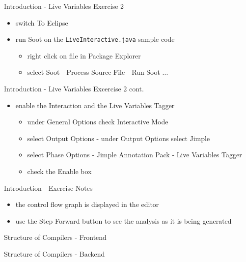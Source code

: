 \documentclass[mcgill,slideColor,colorBG,pdf]{prosper}
\begin{document}
\begin{slide} {Introduction - Live Variables Exercise 2}
\begin{itemize}
\item switch To Eclipse
\item run Soot on the \texttt{LiveInteractive.java} sample code
\begin{itemize}
\item right click on file in Package Explorer
\item select Soot - Process Source File - Run Soot ...
\end{itemize}
\end{itemize}

\end{slide}

\begin{slide} {Introduction - Live Variables Excercise 2 cont.}
\begin{itemize}
\item enable the Interaction and the Live Variables Tagger
\begin{itemize}
\item under General Options check Interactive Mode 
\item select Output Options - under Output Options select Jimple
\item select Phase Options - Jimple Annotation Pack - Live Variables Tagger
\item check the Enable box
\end{itemize}
\end{itemize}
\end{slide}

\begin{slide} {Introduction - Exercise Notes}
\begin{itemize}
\item the control flow graph is displayed in the editor
\item use the Step Forward button
to see the analysis as it is being generated
\end{itemize}
\end{slide}

\begin{slide} {Structure of Compilers - Frontend}
\end{slide}

\begin{slide} {Structure of Compilers - Backend}
\end{slide}
\end{document}
